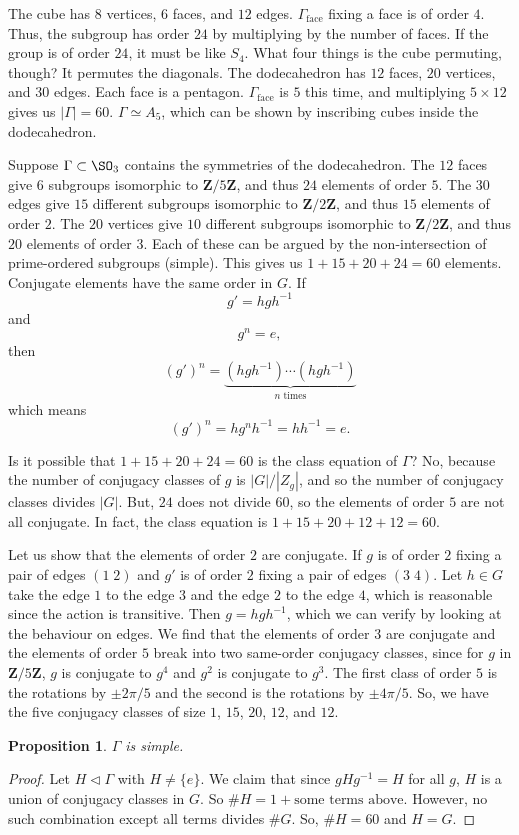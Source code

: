 \documentclass[11pt, oneside]{amsart}
\numberwithin{equation}{section}
\numberwithin{theorem}{section}
\newtheorem{proposition}[theorem]{Proposition}
\theoremstyle{definition}
\def\Z{\mathbf{Z}}
\begin{document}
{The cube has $8$ vertices, $6$ faces, and $12$ edges. $\Gamma_\textrm{face} $ fixing a face is of order $4$. Thus, the subgroup has order $24$ by multiplying by the number of faces. If the group is of order $24$, it must be like $S_4$. What four things is the cube permuting, though? It permutes the diagonals. The dodecahedron has $12$ faces, $20$ vertices, and $30$ edges. Each face is a pentagon. $\Gamma_\textrm{face}$ is $5$ this time, and multiplying $5\times 12$ gives us $|\Gamma| = 60$. $\Gamma\simeq A_5$, which can be shown by inscribing cubes inside the dodecahedron.

Suppose $\Gamma \subset\SO_3$ contains the symmetries of the dodecahedron. The $12$ faces give $6$ subgroups isomorphic to $\Z/5\Z$, and thus $24$ elements of order $5$. The $30$ edges give $15$ different subgroups isomorphic to $\Z/2\Z$, and thus $15$ elements of order $2$. The $20$ vertices give $10$ different subgroups isomorphic to $\Z/2\Z$, and thus $20$ elements of order $3$. Each of these can be argued by the non-intersection of prime-ordered subgroups (simple). This gives us $1 + 15 + 20 + 24 = 60$ elements. Conjugate elements have the same order in $G$. If 
$$
g' = hgh^{-1}
$$
and 
$$
g^n = e,
$$
then 
$$
(g')^n = \underbrace{(hgh^{-1})\cdots(hgh^{-1})}_{n\textrm{ times}}
$$
which means
$$
(g')^n = hg^nh^{-1}= hh^{-1} = e.
$$

Is it possible that $1 + 15 + 20 + 24 = 60$ is the class equation of $\Gamma$? No, because the number of conjugacy classes of $g$ is $|G|/|Z_g|$, and so the number of conjugacy classes divides $|G|$. But, $24$ does not divide $60$, so the elements of order $5$ are not all conjugate. In fact, the class equation is $1 + 15 + 20 + 12 + 12 = 60$. 

Let us show that the elements of order $2$ are conjugate. If $g$ is of order $2$ fixing a pair of edges $(1\;2)$ and $g'$ is of order $2$ fixing a pair of edges $(3\;4)$. Let $h\in G$ take the edge $1$ to the edge $3$ and the edge $2$ to the edge $4$, which is reasonable since the action is transitive. Then $g = hgh^{-1}$, which we can verify by looking at the behaviour on edges. We find that the elements of order $3$ are conjugate and the elements of order $5$ break into two same-order conjugacy classes, since for $g$ in $\Z/5\Z$, $g$ is conjugate to $g^4$ and $g^2$ is conjugate to $g^3$. The first class of order $5$ is the rotations by $\pm 2\pi/5$ and the second is the rotations by $\pm 4\pi/5$. So, we have the five conjugacy classes of size $1$, $15$, $20$, $12$, and $12$. 
\begin{proposition}
$\Gamma$ is simple. 
\end{proposition}
\begin{proof}
Let $H\lhd \Gamma$ with $H\neq \{e\}$. We claim that since $gHg^{-1} = H$ for all $g$, $H$ is a union of conjugacy classes in $G$. So $\# H= 1 + \textrm{some terms above}$. However, no such combination except all terms divides $\# G$. So, $\# H=60$ and $H=G$. %
\end{proof}

}
\end{document}
